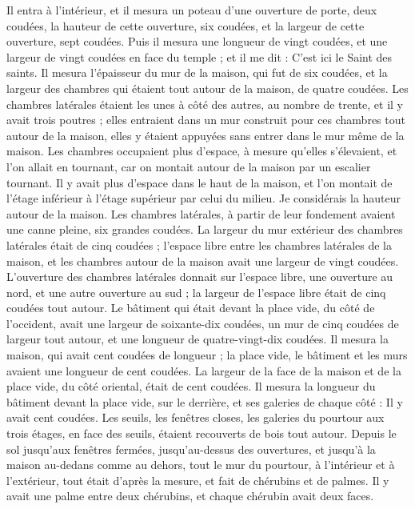 \begin{multicols}{2}
Il entra à l'intérieur, et il mesura un poteau d'une ouverture de porte, deux coudées, la hauteur de cette ouverture, six coudées, et la largeur de cette ouverture, sept coudées.
Puis il mesura une longueur de vingt coudées, et une largeur de vingt coudées en face du temple ; et il me dit : C'est ici le Saint des saints.
Il mesura l'épaisseur du mur de la maison, qui fut de six coudées, et la largeur des chambres qui étaient tout autour de la maison, de quatre coudées.
Les chambres latérales étaient les unes à côté des autres, au nombre de trente, et il y avait trois poutres ; elles entraient dans un mur construit pour ces chambres tout autour de la maison, elles y étaient appuyées sans entrer dans le mur même de la maison.
Les chambres occupaient plus d’espace, à mesure qu’elles s’élevaient, et l’on allait en tournant, car on montait autour de la maison par un escalier tournant. Il y avait plus d’espace dans le haut de la maison, et l’on montait de l’étage inférieur à l’étage supérieur par celui du milieu.
Je considérais la hauteur autour de la maison. Les chambres latérales, à partir de leur fondement avaient une canne pleine, six grandes coudées.
La largeur du mur extérieur des chambres latérales était de cinq coudées ; l’espace libre entre les chambres latérales de la maison,
et les chambres autour de la maison avait une largeur de vingt coudées.
L'ouverture des chambres latérales donnait sur l’espace libre, une ouverture au nord, et une autre ouverture au sud ; la largeur de l’espace libre était de cinq coudées tout autour.
Le bâtiment qui était devant la place vide, du côté de l’occident, avait une largeur de soixante-dix coudées, un mur de cinq coudées de largeur tout autour, et une longueur de quatre-vingt-dix coudées.
Il mesura la maison, qui avait cent coudées de longueur ; la place vide, le bâtiment et les murs avaient une longueur de cent coudées.
La largeur de la face de la maison et de la place vide, du côté oriental, était de cent coudées.
Il mesura la longueur du bâtiment devant la place vide, sur le derrière, et ses galeries de chaque côté : Il y avait cent coudées.
Les seuils, les fenêtres closes, les galeries du pourtour aux trois étages, en face des seuils, étaient recouverts de bois tout autour. Depuis le sol jusqu’aux fenêtres fermées,
jusqu’au-dessus des ouvertures, et jusqu’à la maison au-dedans comme au dehors, tout le mur du pourtour, à l’intérieur et à l’extérieur, tout était d’après la mesure,
et fait de chérubins et de palmes. Il y avait une palme entre deux chérubins, et chaque chérubin avait deux faces.

\end{multicols}

